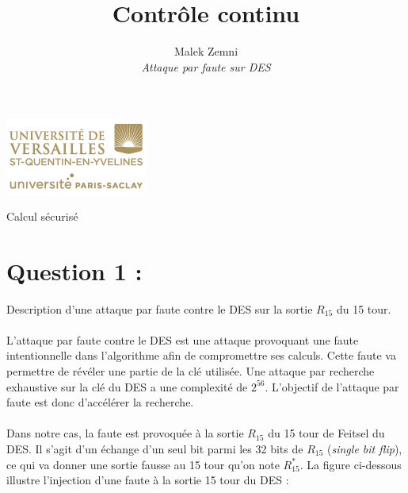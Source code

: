 

\title{\vspace{\fill}\textbf{\Huge Contrôle continu}}
\author{
	Malek Zemni
	\vspace{2em}\\
	\textit{Attaque par faute sur DES}
	\vspace{2em}
}




\clearpage
\maketitle\vspace{9em}
\begin{center}\includegraphics[scale=0.7]{logo.png}\end{center}
\begin{flushright}Calcul sécurisé\end{flushright}

\newpage\clearpage{}

	
	\section*{Question 1 :} 
		
		\noindent Description d'une attaque par faute contre le DES sur la sortie $R_{15}$ du 15 tour.
		
		\paragraph{} L'attaque par faute contre le DES est une attaque provoquant une faute intentionnelle dans l'algorithme afin de compromettre ses calculs. Cette faute va permettre de révéler une partie de la clé utilisée. Une attaque par recherche exhaustive sur la clé du DES a une complexité de $2^{56}$. L'objectif de l'attaque par faute est donc d'accélérer la recherche.
		
		\paragraph{} Dans notre cas, la faute est provoquée à la sortie $R_{15}$ du 15 tour de Feitsel du DES. Il s'agit d'un échange d'un seul bit parmi les 32 bits de $R_{15}$ (\textit{single bit flip}), ce qui va donner une sortie fausse au 15 tour qu'on note $R_{15}^{*}$. La figure ci-dessous illustre l'injection d'une faute à la sortie 15 tour du DES :
		
